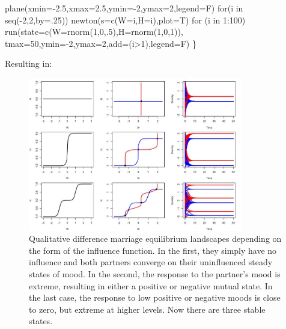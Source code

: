 \documentclass[
  letterpaper,
]{scrbook}
\newenvironment{Shaded}{\begin{snugshade}}{\end{snugshade}}
\newcommand{\AttributeTok}[1]{\textcolor[rgb]{0.40,0.45,0.13}{#1}}
\newcommand{\ControlFlowTok}[1]{\textcolor[rgb]{0.00,0.23,0.31}{#1}}
\newcommand{\DecValTok}[1]{\textcolor[rgb]{0.68,0.00,0.00}{#1}}
\newcommand{\FloatTok}[1]{\textcolor[rgb]{0.68,0.00,0.00}{#1}}
\newcommand{\FunctionTok}[1]{\textcolor[rgb]{0.28,0.35,0.67}{#1}}
\newcommand{\NormalTok}[1]{\textcolor[rgb]{0.00,0.23,0.31}{#1}}
\newcommand{\SpecialCharTok}[1]{\textcolor[rgb]{0.37,0.37,0.37}{#1}}
\begin{document}
\begin{Shaded}
\begin{Highlighting}[]
\FunctionTok{plane}\NormalTok{(}\AttributeTok{xmin=}\SpecialCharTok{{-}}\FloatTok{2.5}\NormalTok{,}\AttributeTok{xmax=}\FloatTok{2.5}\NormalTok{,}\AttributeTok{ymin=}\SpecialCharTok{{-}}\DecValTok{2}\NormalTok{,}\AttributeTok{ymax=}\DecValTok{2}\NormalTok{,}\AttributeTok{legend=}\NormalTok{F)}
\ControlFlowTok{for}\NormalTok{(i }\ControlFlowTok{in} \FunctionTok{seq}\NormalTok{(}\SpecialCharTok{{-}}\DecValTok{2}\NormalTok{,}\DecValTok{2}\NormalTok{,}\AttributeTok{by=}\NormalTok{.}\DecValTok{25}\NormalTok{)) }\FunctionTok{newton}\NormalTok{(}\AttributeTok{s=}\FunctionTok{c}\NormalTok{(}\AttributeTok{W=}\NormalTok{i,}\AttributeTok{H=}\NormalTok{i),}\AttributeTok{plot=}\NormalTok{T)}
\ControlFlowTok{for}\NormalTok{ (i }\ControlFlowTok{in} \DecValTok{1}\SpecialCharTok{:}\DecValTok{100}\NormalTok{)}
  \FunctionTok{run}\NormalTok{(}\AttributeTok{state=}\FunctionTok{c}\NormalTok{(}\AttributeTok{W=}\FunctionTok{rnorm}\NormalTok{(}\DecValTok{1}\NormalTok{,}\DecValTok{0}\NormalTok{,.}\DecValTok{5}\NormalTok{),}\AttributeTok{H=}\FunctionTok{rnorm}\NormalTok{(}\DecValTok{1}\NormalTok{,}\DecValTok{0}\NormalTok{,}\DecValTok{1}\NormalTok{)), }\AttributeTok{tmax=}\DecValTok{50}\NormalTok{,}\AttributeTok{ymin=}\SpecialCharTok{{-}}\DecValTok{2}\NormalTok{,}\AttributeTok{ymax=}\DecValTok{2}\NormalTok{,}\AttributeTok{add=}\NormalTok{(i}\SpecialCharTok{\textgreater{}}\DecValTok{1}\NormalTok{),}\AttributeTok{legend=}\NormalTok{F)}
\NormalTok{\}}
\end{Highlighting}
\end{Shaded}

Resulting in:

\begin{figure}

{\centering \includegraphics[width=3.69156in,height=\textheight]{media/ch5/image10.jpg}

}

\caption{\label{fig-ch5-img10-old-58}Qualitative difference marriage
equilibrium landscapes depending on the form of the influence function.
In the first, they simply have no influence and both partners converge
on their uninfluenced steady states of mood. In the second, the response
to the partner's mood is extreme, resulting in either a positive or
negative mutual state. In the last case, the response to low positive or
negative moods is close to zero, but extreme at higher levels. Now there
are three stable states.}

\end{figure}
\end{document}
